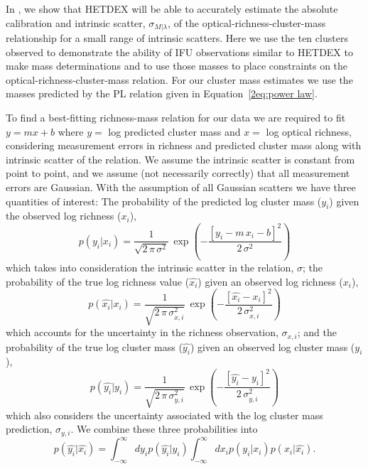 In , we show that HETDEX will be able to accurately estimate the absolute calibration and intrinsic scatter, $\sigma_{M|\lambda}$, of the optical-richness-cluster-mass relationship for a small range of intrinsic scatters. Here we use the ten clusters observed to demonstrate the ability of IFU observations similar to HETDEX to make mass determinations and to use those masses to place constraints on the optical-richness-cluster-mass relation. For our cluster mass estimates we use the masses predicted by the PL relation given in Equation~\ref{2eq:power law}. 

To find a best-fitting richness-mass relation for our data we are required to fit $y=mx+b$ where $y =$ log predicted cluster mass and $x =$ log optical richness, considering measurement errors in richness and predicted cluster mass along with intrinsic scatter of the relation. We assume the intrinsic scatter is constant from point to point, and we assume (not necessarily correctly) that all measurement errors are Gaussian. With the assumption of all Gaussian scatters we have three quantities of interest:
The probability of the predicted log cluster mass ($y_i$) given the observed log richness ($x_i$),
\begin{equation}\label{2eqn:intrinsic scatter}
	p(y_i|x_i) = \frac{1}{\sqrt{2\,\pi\,\sigma^2}}
	 \,\exp\left(-\frac{[y_i - m\,x_i - b]^2}{2\,\sigma^2}\right)
\end{equation}
which takes into consideration the intrinsic scatter in the relation, $\sigma$; the probability of the true log richness value ($\hat{x_i}$) given an observed log richness ($x_i$),
\begin{equation}\label{2eqn:xerr}
	p(\hat{x_i}|x_i) = \frac{1}{\sqrt{2\,\pi\,\sigma_{x,i}^2}}
	 \,\exp\left(-\frac{[\hat{x_i} - x_i]^2}{2\,\sigma_{x,i}^2}\right)
\end{equation}
which accounts for the uncertainty in the richness observation, $\sigma_{x,i}$; and the probability of the true log cluster mass ($\hat{y_i}$) given an observed log cluster mass ($y_i$),
\begin{equation}\label{2eqn:yerr}
	p(\hat{y_i}|y_i) = \frac{1}{\sqrt{2\,\pi\,\sigma_{y,i}^2}}
	 \,\exp\left(-\frac{[\hat{y_i} -y_i]^2}{2\,\sigma_{y,i}^2}\right)
\end{equation}
which also considers the uncertainty associated with the log cluster mass prediction, $\sigma_{y,i}$. We combine these three probabilities into
\begin{equation}
	p(\hat{y_i}|\hat{x_i}) = \int_{-\infty}^\infty dy_ip(\hat{y_i}|y_i) \int_{-\infty}^\infty dx_ip(y_i|x_i)p(x_i|\hat{x_i}).
\end{equation}
